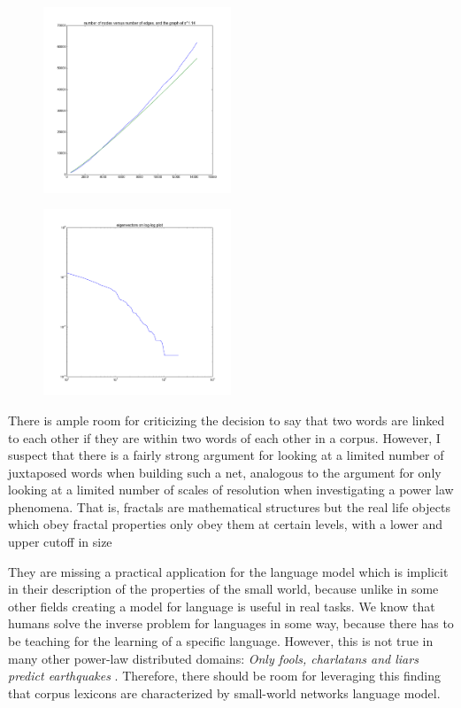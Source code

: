 \documentclass[12pt]{article}
\begin{document}
\begin{figure}
  \includegraphics[width=0.5\textwidth]{densification_plot.png}
\end{figure}

\begin{figure}
  \includegraphics[width=0.5\textwidth]{eigenvector_loglog.png}
\end{figure}

There is ample room for criticizing the decision to say that two words are linked to each other if they are within two words of each other in a corpus. However, I suspect that there is a fairly strong argument for looking at a limited number of juxtaposed words when building such a net, analogous to the argument for only looking at a limited number of scales of resolution when investigating a power law phenomena. That is, fractals are mathematical structures but the real life objects which obey fractal properties only obey them at certain levels, with a lower and upper cutoff in size \cite{fractalcutoffs}

They are missing a practical application for the language model which is implicit in their description of the properties of the small world, because unlike in some other fields creating a model for language is useful in real tasks. We know that humans solve the inverse problem for languages in some way, because there has to be teaching for the learning of a specific language. However, this is not true in many other power-law distributed domains: \emph{Only fools, charlatans and liars predict earthquakes} \cite{richter}. Therefore, there should be room for leveraging this finding that corpus lexicons are characterized by small-world networks language model.
\end{document}
